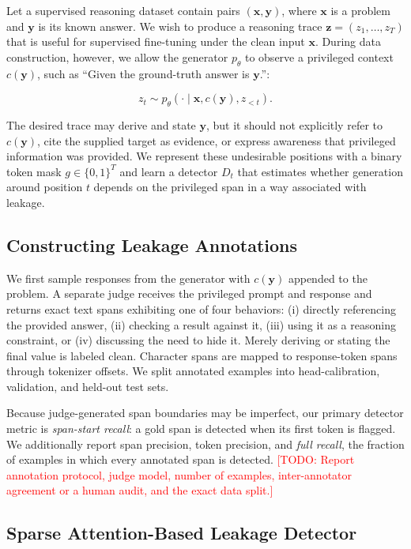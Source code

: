 \documentclass[11pt]{article}
\newcommand{\todo}[1]{\textcolor{red}{[TODO: #1]}}
\newcommand{\bx}{\mathbf{x}}
\newcommand{\by}{\mathbf{y}}
\newcommand{\bz}{\mathbf{z}}
\begin{document}
Let a supervised reasoning dataset contain pairs $(\bx,\by)$, where $\bx$ is a
problem and $\by$ is its known answer.  We wish to produce a reasoning trace
$\bz=(z_1,\ldots,z_T)$ that is useful for supervised fine-tuning under the clean
input $\bx$.  During data construction, however, we allow the generator
$p_\theta$ to observe a privileged context $c(\by)$, such as
``Given the ground-truth answer is $\by$.'':

\begin{equation}
  z_t \sim p_\theta(\cdot \mid \bx, c(\by), z_{<t}).
  \label{eq:privileged-generation}
\end{equation}

The desired trace may derive and state $\by$, but it should not explicitly
refer to $c(\by)$, cite the supplied target as evidence, or express awareness
that privileged information was provided.  We represent these undesirable
positions with a binary token mask $g\in\{0,1\}^T$ and learn a detector
$D_t$ that estimates whether generation around position $t$ depends on the
privileged span in a way associated with leakage.

\subsection{Constructing Leakage Annotations}
\label{sec:annotations}

We first sample responses from the generator with $c(\by)$ appended to the
problem.  A separate judge receives the privileged prompt and response and
returns exact text spans exhibiting one of four behaviors: (i) directly
referencing the provided answer, (ii) checking a result against it, (iii) using
it as a reasoning constraint, or (iv) discussing the need to hide it.  Merely
deriving or stating the final value is labeled clean.  Character spans are
mapped to response-token spans through tokenizer offsets.  We split annotated
examples into head-calibration, validation, and held-out test sets.

Because judge-generated span boundaries may be imperfect, our primary detector
metric is \emph{span-start recall}: a gold span is detected when its first token
is flagged.  We additionally report span precision, token precision, and
\emph{full recall}, the fraction of examples in which every annotated span is
detected.  \todo{Report annotation protocol, judge model, number of examples,
inter-annotator agreement or a human audit, and the exact data split.}

\subsection{Sparse Attention-Based Leakage Detector}
\label{sec:detector}
\end{document}
